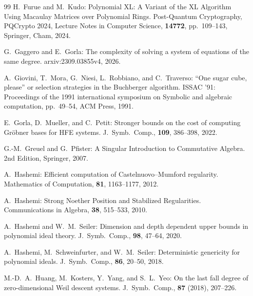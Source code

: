 \documentclass{article}
\theoremstyle{definition}
\theoremstyle{plain}
\theoremstyle{plain}
\theoremstyle{plain}
\theoremstyle{plain}
\numberwithin{equation}{subsection}
\begin{document}
\begin{thebibliography}{99}
H.\ Furue and M.\ Kudo:
Polynomial XL: A Variant of the XL Algorithm Using Macaulay Matrices over Polynomial Rings.
Post-Quantum Cryptography, PQCrypto 2024, Lecture Notes in Computer Science, {\bf 14772}, pp.\ 109--143, Springer, Cham, 2024.


G.\ Gaggero and E.\ Gorla:
The complexity of solving a system of equations of the same degree.
arxiv:2309.03855v4, 2026.

A.\ Giovini, T.\ Mora, G.\ Niesi, L.\ Robbiano, and C.\ Traverso:
``One sugar cube, please'' or selection strategies in the 
Buchberger algorithm.
ISSAC '91: Proceedings of the 1991 international symposium on Symbolic and algebraic computation, 
pp.\ 49--54, ACM Press, 1991. 

E.\ Gorla, D.\ Mueller, and C.\ Petit:
Stronger bounds on the cost of computing Gr\"{o}bner bases for HFE systems.
J.\ Symb.\ Comp., {\bf 109}, 386--398, 2022.

G.-M.\ Greuel and G.\ Pfister:
A Singular Introduction to Commutative Algebra.
2nd Edition, Springer, 2007. 


A.\ Hashemi:
Efficient computation of Castelnuovo--Mumford regularity.
Mathematics of Computation, {\bf 81}, 1163--1177, 2012.

A.\ Hashemi:
Strong Noether Position and Stabilized Regularities.
Communications in Algebra, {\bf 38}, 515--533, 2010.

A.\ Hashemi and W.\ M.\ Seiler:
Dimension and depth dependent upper bounds in polynomial ideal theory.
J.\ Symb.\ Comp., {\bf 98}, 47--64, 2020.

A.\ Hashemi, M.\ Schweinfurter, and W.\ M.\ Seiler:
Deterministic genericity for polynomial ideals.
J.\ Symb.\ Comp., {\bf 86}, 20--50, 2018.

M.-D.\ A.\ Huang, M.\ Kosters, Y.\ Yang, and S.\ L.\ Yeo:
On the last fall degree of zero-dimensional Weil descent systems.
J.\ Symb.\ Comp., {\bf 87} (2018), 207--226.


\end{thebibliography}
\end{document}
